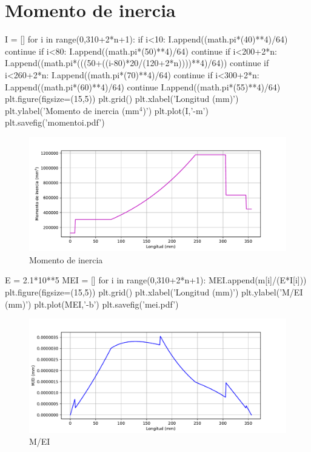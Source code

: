 \documentclass[a4paper,11pt]{report}
\begin{document}
\chapter*{Momento de inercia}
\begin{pyglist}[language=python,caption={Cálculo del momento flector},style=tango]
I = []
for i in range(0,310+2*n+1):
    if i<10:
        I.append((math.pi*(40)**4)/64)
        continue
    if i<80:
        I.append((math.pi*(50)**4)/64)
        continue
    if i<200+2*n:
        I.append((math.pi*(((50+((i-80)*20/(120+2*n))))**4)/64))
        continue
    if i<260+2*n:
        I.append((math.pi*(70)**4)/64)
        continue
    if i<300+2*n:
        I.append((math.pi*(60)**4)/64)
        continue
    I.append((math.pi*(55)**4)/64)
plt.figure(figsize=(15,5))
plt.grid()
plt.xlabel('Longitud (mm)')
plt.ylabel('Momento de inercia (mm$^4$)')
plt.plot(I,'-m')
plt.savefig('momentoi.pdf')
\end{pyglist}
\begin{figure}[H]
\centering
\includegraphics[scale=0.72]{momentoi.pdf}
\caption{Momento de inercia}
\end{figure}
\begin{pyglist}[language=python,caption={Cálculo del momento flector},style=tango]
E = 2.1*10**5
MEI = []
for i in range(0,310+2*n+1):
    MEI.append(m[i]/(E*I[i]))
plt.figure(figsize=(15,5))
plt.grid()
plt.xlabel('Longitud (mm)')
plt.ylabel('M/EI (mm)')
plt.plot(MEI,'-b')
plt.savefig('mei.pdf')
\end{pyglist}
\begin{figure}[H]
\centering
\includegraphics[scale=0.72]{mei.pdf}
\caption{M/EI}
\end{figure}
\end{document}
